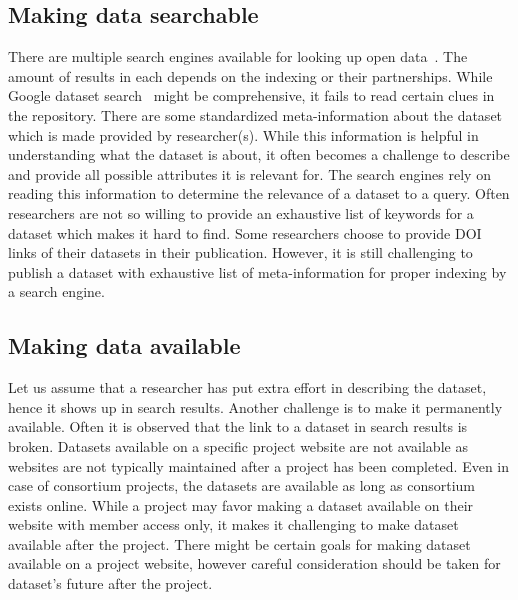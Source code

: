 \documentclass[12pt]{elsarticle}
\begin{document}
\subsection*{Making data searchable}
There are multiple search engines available for looking up open data~\cite{gdataset, auopendata,dansNL, openaire}. 
The amount of results in each depends on the indexing or their partnerships. 
While Google dataset search~\cite{gdataset} might be comprehensive, it fails to read certain clues in the repository. 
There are some standardized meta-information about the dataset which is made provided by researcher(s). 
While this information is helpful in understanding what the dataset is about, it often becomes a challenge to describe and provide all possible attributes it is relevant for. 
The search engines rely on reading this information to determine the relevance of a dataset to a query. 
Often researchers are not so willing to provide an exhaustive list of keywords for a dataset which makes it hard to find. 
Some researchers choose to provide DOI links of their datasets in their publication. 
However, it is still challenging to publish a dataset with exhaustive list of meta-information for proper indexing by a search engine. 
\subsection*{Making data available}
Let us assume that a researcher has put extra effort in describing the dataset, hence it shows up in search results. 
Another challenge is to make it permanently available. 
Often it is observed that the link to a dataset in search results is broken. 
Datasets available on a specific project website are not available as websites are not typically maintained after a project has been completed. 
Even in case of consortium projects, the datasets are available as long as consortium exists online. 
While a project may favor making a dataset available on their website with member access only, it makes it challenging to make dataset available after the project. 
There might be certain goals for making dataset available on a project website, however careful consideration should be taken for dataset's future after the project. 
\end{document}
